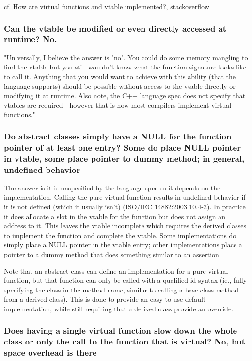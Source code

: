 \documentclass[10pt]{amsart}
\begin{document}
cf. \href{https://stackoverflow.com/questions/99297/how-are-virtual-functions-and-vtable-implemented}{How are virtual functions and vtable implemented?, stackoverflow}  

\subsubsection{Can the vtable be modified or even directly accessed at runtime?  No.}  

"Universally, I believe the answer is "no". You could do some memory mangling to find the vtable but you still wouldn't know what the function signature looks like to call it. Anything that you would want to achieve with this ability (that the language supports) should be possible without access to the vtable directly or modifying it at runtime. Also note, the C++ language spec does not specify that vtables are required - however that is how most compilers implement virtual functions."  

\subsubsection{Do abstract classes simply have a NULL for the function pointer of at least one entry?  Some do place NULL pointer in vtable, some place pointer to dummy method; in general, undefined behavior}

The answer is it is unspecified by the language spec so it depends on the implementation. Calling the pure virtual function results in undefined behavior if it is not defined (which it usually isn't) (ISO/IEC 14882:2003 10.4-2). In practice it does allocate a slot in the vtable for the function but does not assign an address to it. This leaves the vtable incomplete which requires the derived classes to implement the function and complete the vtable. Some implementations do simply place a NULL pointer in the vtable entry; other implementations place a pointer to a dummy method that does something similar to an assertion.

Note that an abstract class can define an implementation for a pure virtual function, but that function can only be called with a qualified-id syntax (ie., fully specifying the class in the method name, similar to calling a base class method from a derived class). This is done to provide an easy to use default implementation, while still requiring that a derived class provide an override.

\subsubsection{Does having a single virtual function slow down the whole class or only the call to the function that is virtual?  No, but space overhead is there}  
\end{document}
